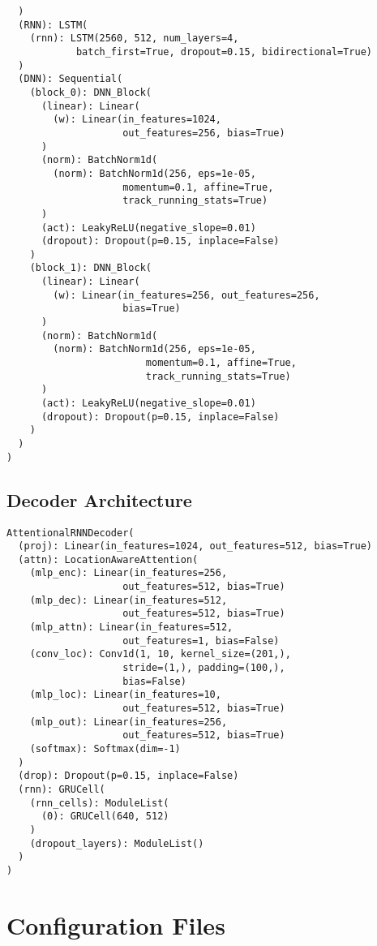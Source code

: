 \begin{verbatim}
  )
  (RNN): LSTM(
    (rnn): LSTM(2560, 512, num_layers=4, 
            batch_first=True, dropout=0.15, bidirectional=True)
  )
  (DNN): Sequential(
    (block_0): DNN_Block(
      (linear): Linear(
        (w): Linear(in_features=1024, 
                    out_features=256, bias=True)
      )
      (norm): BatchNorm1d(
        (norm): BatchNorm1d(256, eps=1e-05, 
                    momentum=0.1, affine=True, 
                    track_running_stats=True)
      )
      (act): LeakyReLU(negative_slope=0.01)
      (dropout): Dropout(p=0.15, inplace=False)
    )
    (block_1): DNN_Block(
      (linear): Linear(
        (w): Linear(in_features=256, out_features=256, 
                    bias=True)
      )
      (norm): BatchNorm1d(
        (norm): BatchNorm1d(256, eps=1e-05, 
                        momentum=0.1, affine=True, 
                        track_running_stats=True)
      )
      (act): LeakyReLU(negative_slope=0.01)
      (dropout): Dropout(p=0.15, inplace=False)
    )
  )
)
\end{verbatim}


\section*{Decoder Architecture}

\begin{verbatim}
AttentionalRNNDecoder(
  (proj): Linear(in_features=1024, out_features=512, bias=True)
  (attn): LocationAwareAttention(
    (mlp_enc): Linear(in_features=256, 
                    out_features=512, bias=True)
    (mlp_dec): Linear(in_features=512,
                    out_features=512, bias=True)
    (mlp_attn): Linear(in_features=512, 
                    out_features=1, bias=False)
    (conv_loc): Conv1d(1, 10, kernel_size=(201,), 
                    stride=(1,), padding=(100,), 
                    bias=False)
    (mlp_loc): Linear(in_features=10, 
                    out_features=512, bias=True)
    (mlp_out): Linear(in_features=256, 
                    out_features=512, bias=True)
    (softmax): Softmax(dim=-1)
  )
  (drop): Dropout(p=0.15, inplace=False)
  (rnn): GRUCell(
    (rnn_cells): ModuleList(
      (0): GRUCell(640, 512)
    )
    (dropout_layers): ModuleList()
  )
)

\end{verbatim}


\chapter{Configuration Files}
\label{chapter:hyparam}

